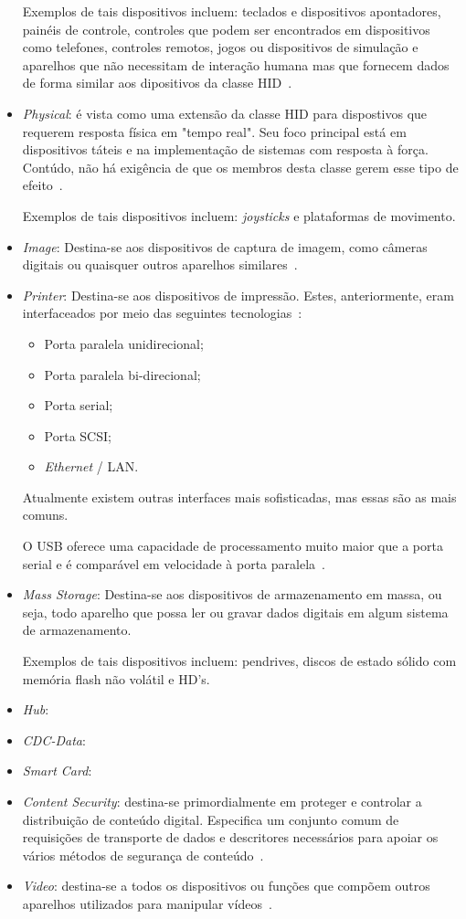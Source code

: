 \begin{itemize}
	Exemplos de tais dispositivos incluem: teclados e dispositivos apontadores, painéis de controle, controles que podem ser encontrados em dispositivos como telefones, controles remotos, jogos ou dispositivos de simulação e aparelhos que não necessitam de interação humana mas que fornecem dados de forma similar aos dipositivos da classe HID~\cite{hid}.
	\item \emph{Physical}: é vista como uma extensão da classe HID para dispostivos que requerem resposta física em "tempo real". Seu foco principal está em dispositivos táteis e na implementação de sistemas com resposta à força. Contúdo, não há exigência de que os membros desta classe gerem esse tipo de efeito~\cite{usbphysicalclass}.

	Exemplos de tais dispositivos incluem: \emph{joysticks} e plataformas de movimento.
	\item \emph{Image}: Destina-se aos dispositivos de captura de imagem, como câmeras digitais ou quaisquer outros aparelhos similares~\cite{usbimageclass}.
	\item \emph{Printer}: Destina-se aos dispositivos de impressão. Estes, anteriormente, eram interfaceados por meio das seguintes tecnologias~\cite{usbprintclass}:
	\begin{itemize}
		\item Porta paralela unidirecional;
		\item Porta paralela bi-direcional;
		\item Porta serial;
		\item Porta SCSI;
		\item \emph{Ethernet} / LAN.
	\end{itemize}

	Atualmente existem outras interfaces mais sofisticadas, mas essas são as mais comuns.

	O USB oferece uma capacidade de processamento muito maior que a porta serial e é comparável em velocidade à porta paralela~\cite{usbprintclass}.
	\item \emph{Mass Storage}: Destina-se aos dispositivos de armazenamento em massa, ou seja, todo aparelho que possa ler ou gravar dados digitais em algum sistema de armazenamento.

	Exemplos de tais dispositivos incluem: pendrives, discos de estado sólido com memória flash não volátil e HD's.
	\item \emph{Hub}: 
	\item \emph{CDC-Data}: 
	\item \emph{Smart Card}: 
	\item \emph{Content Security}: destina-se primordialmente em proteger e controlar a distribuição de conteúdo digital. Especifica um conjunto comum de requisições de transporte de dados e descritores necessários para apoiar os vários métodos de segurança de conteúdo~\cite{usbcontentsecurityclass}.
	\item \emph{Video}: destina-se a todos os dispositivos ou funções que compõem outros aparelhos utilizados para manipular vídeos~\cite{usbvideoclass}.


\end{itemize}
